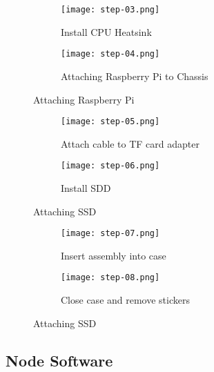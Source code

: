 \begin{figure}[H]
  \centering
  \begin{subfigure}[b]{0.45\textwidth}
    \centering
    \texttt{[image: step-03.png]}
    \caption{Install CPU Heatsink}
    \label{fig:step-03}
  \end{subfigure}
  \hfill
  \begin{subfigure}[b]{0.45\textwidth}
    \centering
    \texttt{[image: step-04.png]}
    \caption{Attaching Raspberry Pi to Chassis}
    \label{fig:step-04.png}
  \end{subfigure}
  \caption{Attaching Raspberry Pi}
  \label{fig:node-steps-01-02}
\end{figure}


\begin{figure}[H]
  \centering
  \begin{subfigure}[b]{0.45\textwidth}
    \centering
    \texttt{[image: step-05.png]}
    \caption{Attach cable to TF card adapter}
    \label{fig:step-05}
  \end{subfigure}
  \hfill
  \begin{subfigure}[b]{0.45\textwidth}
    \centering
    \texttt{[image: step-06.png]}
    \caption{Install SDD}
    \label{fig:step-06.png}
  \end{subfigure}
  \caption{Attaching SSD}
  \label{fig:node-steps-01-02}
\end{figure}


\begin{figure}[H]
  \vspace*{-\topskip} %
  \centering
  \begin{subfigure}[b]{0.45\textwidth}
    \centering
    \texttt{[image: step-07.png]}
    \caption{Insert assembly into case}
    \label{fig:step-06}
  \end{subfigure}
  \hfill
  \begin{subfigure}[b]{0.45\textwidth}
    \centering
    \texttt{[image: step-08.png]}
    \caption{Close case and remove stickers}
    \label{fig:step-08.png}
  \end{subfigure}
  \caption{Attaching SSD}
  \label{fig:node-steps-01-02}
\end{figure}



\subsection{Node Software}

